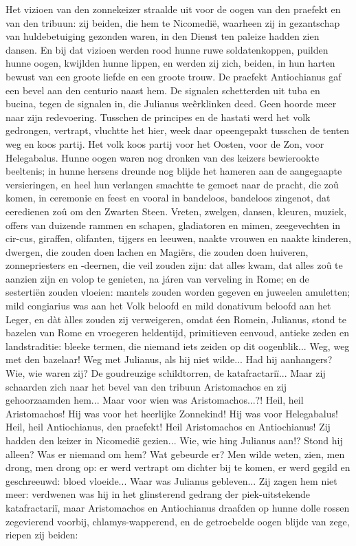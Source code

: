 \documentclass[a4paper, 12pt, oneside, dutch]{article}
\begin{document}
Het vizioen van den zonnekeizer straalde uit voor de oogen van den praefekt en van den tribuun: zij beiden, die hem te Nicomedië, waarheen zij in gezantschap van huldebetuiging gezonden waren, in den Dienst ten paleize hadden zien dansen. En bij dat vizioen werden rood hunne ruwe soldatenkoppen, puilden hunne oogen, kwijlden hunne lippen, en werden zij zich, beiden, in hun harten bewust van een groote liefde en een groote trouw. De praefekt Antiochianus gaf een bevel aan den centurio naast hem. De signalen schetterden uit tuba en bucina, tegen de signalen in, die Julianus weêrklinken deed. Geen hoorde meer naar zijn redevoering. Tusschen de principes en de hastati werd het volk gedrongen, vertrapt, vluchtte het hier, week daar opeengepakt tusschen de tenten weg en koos partij. Het volk koos partij voor het Oosten, voor de Zon, voor Helegabalus. Hunne oogen waren nog dronken van des keizers bewierookte beeltenis; in hunne hersens dreunde nog blijde het hameren aan de aangegaapte versieringen, en heel hun verlangen smachtte te gemoet naar de pracht, die zoû komen, in ceremonie en feest en vooral in bandeloos, bandeloos zingenot, dat eeredienen zoû om den Zwarten Steen. Vreten, zwelgen, dansen, kleuren, muziek, offers van duizende rammen en schapen, gladiatoren en mimen, zeegevechten in cir-cus, giraffen, olifanten, tijgers en leeuwen, naakte vrouwen en naakte kinderen, dwergen, die zouden doen lachen en Magiërs, die zouden doen huiveren, zonnepriesters en -deernen, die veil zouden zijn: dat alles kwam, dat alles zoû te aanzien zijn en volop te genieten, na járen van verveling in Rome; en de sestertiën zouden vloeien: mantels zouden worden gegeven en juweelen amuletten; mild congiarius was aan het Volk beloofd en mild donativum beloofd aan het Leger, en dàt àlles zouden zij verweigeren, omdat éen Romein, Julianus, stond te bazelen van Rome en vroegeren heldentijd, primitieven eenvoud, antieke zeden en landstraditie: bleeke termen, die niemand iets zeiden op dit oogenblik... Weg, weg met den bazelaar! Weg met Julianus, als hij niet wilde... Had hij aanhangers? Wie, wie waren zij? De goudreuzige schildtorren, de katafractariï... Maar zij schaarden zich naar het bevel van den tribuun Aristomachos en zij gehoorzaamden hem... Maar voor wien was Aristomachos...?! Heil, heil Aristomachos! Hij was voor het heerlijke Zonnekind! Hij was voor Helegabalus! Heil, heil Antiochianus, den praefekt! Heil Aristomachos en Antiochianus! Zij hadden den keizer in Nicomedië gezien... Wie, wie hing Julianus aan!? Stond hij alleen? Was er niemand om hem? Wat gebeurde er? Men wilde weten, zien, men drong, men drong op: er werd vertrapt om dichter bij te komen, er werd gegild en geschreeuwd: bloed vloeide... Waar was Julianus gebleven... Zij zagen hem niet meer: verdwenen was hij in het glinsterend gedrang der piek-uitstekende katafractariï, maar Aristomachos en Antiochianus draafden op hunne dolle rossen zegevierend voorbij, chlamys-wapperend, en de getroebelde oogen blijde van zege, riepen zij beiden:
\end{document}
